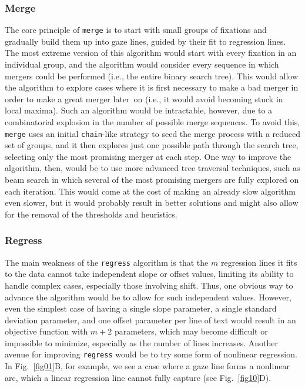 \documentclass[doc,biblatex]{apa7}
\begin{document}
\subsubsection{Merge}

The core principle of \texttt{merge} is to start with small groups of fixations and gradually build them up into gaze lines, guided by their fit to regression lines. The most extreme version of this algorithm would start with every fixation in an individual group, and the algorithm would consider every sequence in which mergers could be performed (i.e., the entire binary search tree). This would allow the algorithm to explore cases where it is first necessary to make a bad merger in order to make a great merger later~on (i.e., it would avoid becoming stuck in local maxima). Such an algorithm would be intractable, however, due to a combinatorial explosion in the number of possible merge sequences. To avoid this, \texttt{merge} uses an initial \texttt{chain}-like strategy to seed the merge process with a reduced set of groups, and it then explores just one possible path through the search tree, selecting only the most promising merger at each step. One way to improve the algorithm, then, would be to use more advanced tree traversal techniques, such as beam search in which several of the most promising mergers are fully explored on each iteration. This would come at the cost of making an already slow algorithm even slower, but it would probably result in better solutions and might also allow for the removal of the thresholds and heuristics.

\subsubsection{Regress}

The main weakness of the \texttt{regress} algorithm is that the $m$ regression lines it fits to the data cannot take independent slope or offset values, limiting its ability to handle complex cases, especially those involving shift. Thus, one obvious way to advance the algorithm would be to allow for such independent values. However, even the simplest case of having a single slope parameter, a single standard deviation parameter, and one offset parameter per line of text would result in an objective function with $m+2$ parameters, which may become difficult or impossible to minimize, especially as the number of lines increases. Another avenue for improving \texttt{regress} would be to try some form of nonlinear regression. In Fig.~\ref{fig01}B, for example, we see a case where a gaze line forms a nonlinear arc, which a linear regression line cannot fully capture (see Fig.~\ref{fig10}D).
\end{document}
